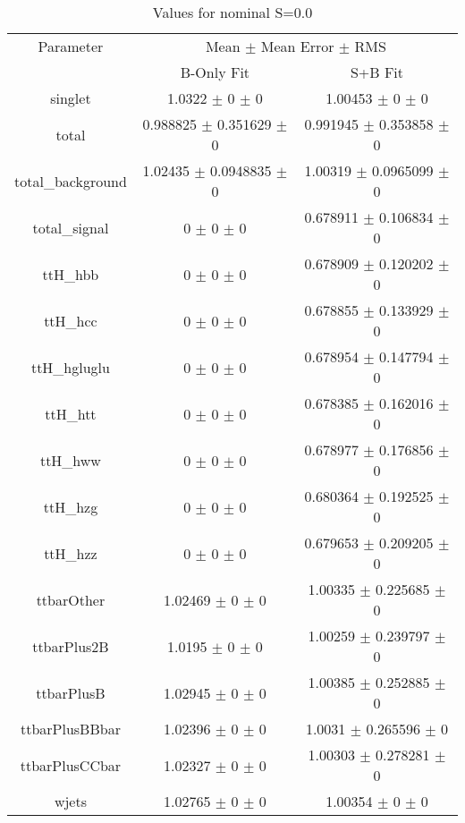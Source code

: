 \begin{table}
\centering
\caption{Values for nominal S=0.0}
\begin{tabular}{ccc}
\toprule
Parameter & \multicolumn{2}{c}{Mean $\pm$ Mean Error $\pm$ RMS}\\
 & B-Only Fit & S+B Fit\\
\midrule
singlet & \num{1.0322} $\pm$ \num{0} $\pm$ \num{0} & \num{1.00453} $\pm$ \num{0} $\pm$ \num{0}\\
total & \num{0.988825} $\pm$ \num{0.351629} $\pm$ \num{0} & \num{0.991945} $\pm$ \num{0.353858} $\pm$ \num{0}\\
total\_background & \num{1.02435} $\pm$ \num{0.0948835} $\pm$ \num{0} & \num{1.00319} $\pm$ \num{0.0965099} $\pm$ \num{0}\\
total\_signal & \num{0} $\pm$ \num{0} $\pm$ \num{0} & \num{0.678911} $\pm$ \num{0.106834} $\pm$ \num{0}\\
ttH\_hbb & \num{0} $\pm$ \num{0} $\pm$ \num{0} & \num{0.678909} $\pm$ \num{0.120202} $\pm$ \num{0}\\
ttH\_hcc & \num{0} $\pm$ \num{0} $\pm$ \num{0} & \num{0.678855} $\pm$ \num{0.133929} $\pm$ \num{0}\\
ttH\_hgluglu & \num{0} $\pm$ \num{0} $\pm$ \num{0} & \num{0.678954} $\pm$ \num{0.147794} $\pm$ \num{0}\\
ttH\_htt & \num{0} $\pm$ \num{0} $\pm$ \num{0} & \num{0.678385} $\pm$ \num{0.162016} $\pm$ \num{0}\\
ttH\_hww & \num{0} $\pm$ \num{0} $\pm$ \num{0} & \num{0.678977} $\pm$ \num{0.176856} $\pm$ \num{0}\\
ttH\_hzg & \num{0} $\pm$ \num{0} $\pm$ \num{0} & \num{0.680364} $\pm$ \num{0.192525} $\pm$ \num{0}\\
ttH\_hzz & \num{0} $\pm$ \num{0} $\pm$ \num{0} & \num{0.679653} $\pm$ \num{0.209205} $\pm$ \num{0}\\
ttbarOther & \num{1.02469} $\pm$ \num{0} $\pm$ \num{0} & \num{1.00335} $\pm$ \num{0.225685} $\pm$ \num{0}\\
ttbarPlus2B & \num{1.0195} $\pm$ \num{0} $\pm$ \num{0} & \num{1.00259} $\pm$ \num{0.239797} $\pm$ \num{0}\\
ttbarPlusB & \num{1.02945} $\pm$ \num{0} $\pm$ \num{0} & \num{1.00385} $\pm$ \num{0.252885} $\pm$ \num{0}\\
ttbarPlusBBbar & \num{1.02396} $\pm$ \num{0} $\pm$ \num{0} & \num{1.0031} $\pm$ \num{0.265596} $\pm$ \num{0}\\
ttbarPlusCCbar & \num{1.02327} $\pm$ \num{0} $\pm$ \num{0} & \num{1.00303} $\pm$ \num{0.278281} $\pm$ \num{0}\\
wjets & \num{1.02765} $\pm$ \num{0} $\pm$ \num{0} & \num{1.00354} $\pm$ \num{0} $\pm$ \num{0}\\
\bottomrule
\end{tabular}
\end{table}